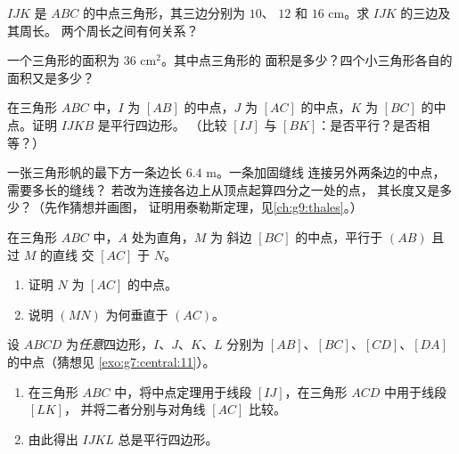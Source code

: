 \begin{exercise}[$\star$]\label{exo:g8:midpoints:4}
$IJK$ 是 $ABC$ 的中点三角形，其三边分别为 $10$、
$12$ 和 $16$ cm。求 $IJK$ 的三边及其周长。
两个周长之间有何关系？
\end{exercise}

\begin{exercise}[$\star$]\label{exo:g8:midpoints:5}
一个三角形的面积为 $36$ cm$^2$。其中点三角形的
面积是多少？四个小三角形各自的面积又是多少？
\end{exercise}

\begin{exercise}[$\star\star$]\label{exo:g8:midpoints:6}
在三角形 $ABC$ 中，$I$ 为 $[AB]$ 的中点，$J$ 为
$[AC]$ 的中点，$K$ 为 $[BC]$ 的中点。证明 $IJKB$ 是平行四边形。
（比较 $[IJ]$ 与 $[BK]$：是否平行？是否相等？）
\end{exercise}

\begin{exercise}[$\star\star$]\label{exo:g8:midpoints:7}
一张三角形帆的最下方一条边长 $6.4$ m。一条加固缝线
连接另外两条边的中点，需要多长的缝线？
若改为连接各边上从顶点起算四分之一处的点，
其长度又是多少？（先作猜想并画图，
证明用泰勒斯定理，见\cref{ch:g9:thales}。）
\end{exercise}

\begin{exercise}[$\star\star$]\label{exo:g8:midpoints:8}
在三角形 $ABC$ 中，$A$ 处为直角，$M$ 为
斜边 $[BC]$ 的中点，平行于 $(AB)$ 且过 $M$ 的直线
交 $[AC]$ 于 $N$。
\begin{enumerate}
  \item 证明 $N$ 为 $[AC]$ 的中点。
  \item 说明 $(MN)$ 为何垂直于 $(AC)$。
\end{enumerate}
\end{exercise}

\begin{exercise}[$\star\star\star$]\label{exo:g8:midpoints:9}
设 $ABCD$ 为\emph{任意}四边形，$I$、$J$、$K$、$L$ 分别为
$[AB]$、$[BC]$、$[CD]$、$[DA]$ 的中点（猜想见
\cref{exo:g7:central:11}）。
\begin{enumerate}
  \item 在三角形 $ABC$ 中，将中点定理用于线段
        $[IJ]$，在三角形 $ACD$ 中用于线段 $[LK]$，
        并将二者分别与对角线 $[AC]$ 比较。
  \item 由此得出 $IJKL$ 总是平行四边形。
\end{enumerate}
\end{exercise}

